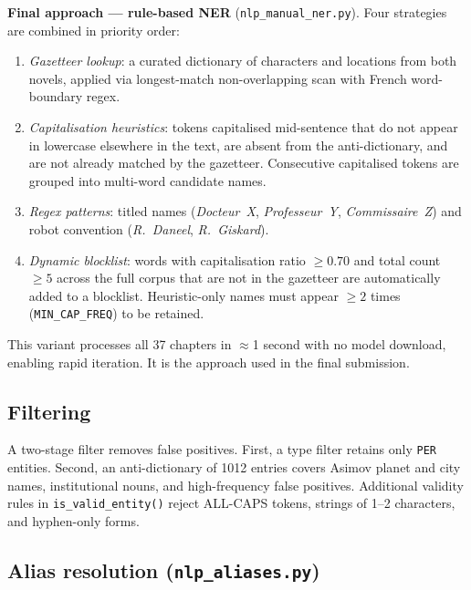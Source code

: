 \documentclass[a4paper]{article}
\begin{document}
\textbf{Final approach --- rule-based NER} (\texttt{nlp\_manual\_ner.py}).
Four strategies are combined in priority order:

\begin{enumerate}
  \item \textit{Gazetteer lookup}: a curated dictionary of characters
        and locations from both novels, applied via longest-match
        non-overlapping scan with French word-boundary regex.
  \item \textit{Capitalisation heuristics}: tokens capitalised mid-sentence
        that do not appear in lowercase elsewhere in the text, are absent
        from the anti-dictionary, and are not already matched by the
        gazetteer. Consecutive capitalised tokens are grouped into
        multi-word candidate names.
  \item \textit{Regex patterns}: titled names (\textit{Docteur~X},
        \textit{Professeur~Y}, \textit{Commissaire~Z}) and robot
        convention (\textit{R.~Daneel}, \textit{R.~Giskard}).
  \item \textit{Dynamic blocklist}: words with capitalisation ratio
        $\geq 0.70$ and total count $\geq 5$ across the full corpus
        that are not in the gazetteer are automatically added to a
        blocklist. Heuristic-only names must appear $\geq 2$ times
        (\texttt{MIN\_CAP\_FREQ}) to be retained.
\end{enumerate}

This variant processes all 37 chapters in $\approx$1 second with no
model download, enabling rapid iteration. It is the approach used in
the final submission.

\subsection{Filtering}

A two-stage filter removes false positives. First, a type filter retains
only \texttt{PER} entities. Second, an anti-dictionary of 1012 entries
covers Asimov planet and city names, institutional nouns, and high-frequency
false positives. Additional validity rules in \texttt{is\_valid\_entity()}
reject ALL-CAPS tokens, strings of 1--2 characters, and hyphen-only forms.

\subsection{Alias resolution (\texttt{nlp\_aliases.py})}
\end{document}
